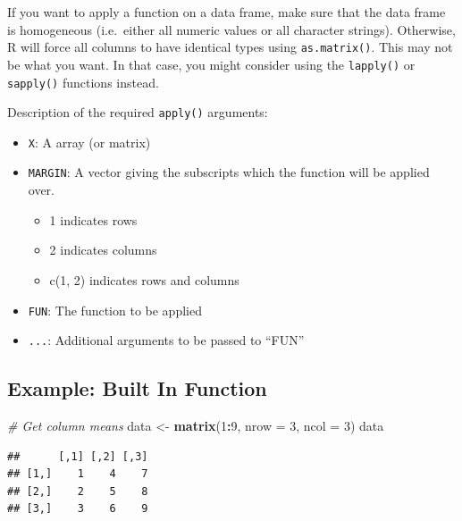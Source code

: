 \documentclass[
]{book}
\newenvironment{Shaded}{\begin{snugshade}}{\end{snugshade}}
\newcommand{\CommentTok}[1]{\textcolor[rgb]{0.56,0.35,0.01}{\textit{#1}}}
\newcommand{\DataTypeTok}[1]{\textcolor[rgb]{0.13,0.29,0.53}{#1}}
\newcommand{\DecValTok}[1]{\textcolor[rgb]{0.00,0.00,0.81}{#1}}
\newcommand{\KeywordTok}[1]{\textcolor[rgb]{0.13,0.29,0.53}{\textbf{#1}}}
\newcommand{\NormalTok}[1]{#1}
\newcommand{\OperatorTok}[1]{\textcolor[rgb]{0.81,0.36,0.00}{\textbf{#1}}}
\newcommand{\StringTok}[1]{\textcolor[rgb]{0.31,0.60,0.02}{#1}}
\providecommand{\tightlist}{%
  \setlength{\itemsep}{0pt}\setlength{\parskip}{0pt}}
\begin{document}
If you want to apply a function on a data frame, make sure that the data frame is homogeneous (i.e.~either all numeric values or all character strings). Otherwise, R will force all columns to have identical types using \texttt{as.matrix()}. This may not be what you want. In that case, you might consider using the \texttt{lapply()} or \texttt{sapply()} functions instead.

Description of the required \texttt{apply()} arguments:

\begin{itemize}
\tightlist
\item
  \texttt{X}: A array (or matrix)
\item
  \texttt{MARGIN}: A vector giving the subscripts which the function will be applied over.

  \begin{itemize}
  \tightlist
  \item
    1 indicates rows
  \item
    2 indicates columns
  \item
    c(1, 2) indicates rows and columns
  \end{itemize}
\item
  \texttt{FUN}: The function to be applied
\item
  \texttt{...}: Additional arguments to be passed to ``FUN''
\end{itemize}

\hypertarget{example-built-in-function}{%
\subsection*{Example: Built In Function}\label{example-built-in-function}}

\begin{Shaded}
\begin{Highlighting}[]
\CommentTok{# Get column means}
\NormalTok{data <-}\StringTok{ }\KeywordTok{matrix}\NormalTok{(}\DecValTok{1}\OperatorTok{:}\DecValTok{9}\NormalTok{, }\DataTypeTok{nrow =} \DecValTok{3}\NormalTok{, }\DataTypeTok{ncol =} \DecValTok{3}\NormalTok{)}
\NormalTok{data}
\end{Highlighting}
\end{Shaded}

\begin{verbatim}
##      [,1] [,2] [,3]
## [1,]    1    4    7
## [2,]    2    5    8
## [3,]    3    6    9
\end{verbatim}
\end{document}
